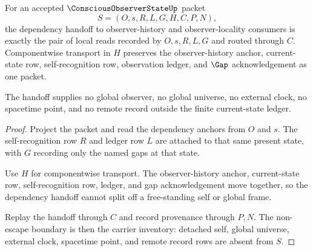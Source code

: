 \begin{theorem}
\label{thm:conscious-observer-state-dependency-handoff}
For an accepted $\ConsciousObserverStateUp$ packet
$$
S=(O,s,R,L,G,H,C,P,N),
$$
the dependency handoff to observer-history and observer-locality consumers is exactly the pair of local reads recorded by $O,s,R,L,G$ and routed through $C$. Componentwise transport in $H$ preserves the observer-history anchor, current-state row, self-recognition row, observation ledger, and $\Gap$ acknowledgement as one packet.

The handoff supplies no global observer, no global universe, no external clock, no spacetime point, and no remote record outside the finite current-state ledger.
\end{theorem}
\begin{proof}
Project the packet and read the dependency anchors from $O$ and $s$. The self-recognition row $R$ and ledger row $L$ are attached to that same present state, with $G$ recording only the named gaps at that state.

Use $H$ for componentwise transport. The observer-history anchor, current-state row, self-recognition row, ledger, and gap acknowledgement move together, so the dependency handoff cannot split off a free-standing self or global frame.

Replay the handoff through $C$ and record provenance through $P,N$. The non-escape boundary is then the carrier inventory: detached self, global universe, external clock, spacetime point, and remote record rows are absent from $S$.
\end{proof}

